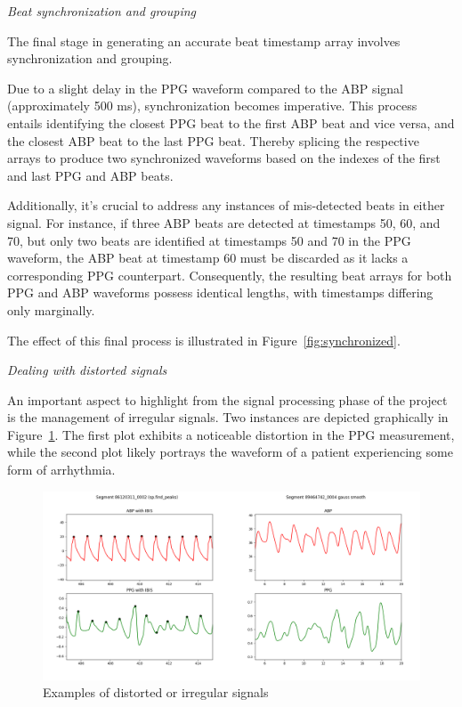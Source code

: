 \textit{Beat synchronization and grouping}
\vspace{0.1cm}

The final stage in generating an accurate beat timestamp array involves synchronization and grouping.

Due to a slight delay in the PPG waveform compared to the ABP signal (approximately 500 ms), synchronization becomes imperative.
This process entails identifying the closest PPG beat to the first ABP beat and vice versa, and the closest ABP beat to the last PPG beat.
Thereby splicing the respective arrays to produce two synchronized waveforms based on the indexes of the first and last PPG and ABP beats.

Additionally, it's crucial to address any instances of mis-detected beats in either signal.
For instance, if three ABP beats are detected at timestamps 50, 60, and 70, but only two beats are identified at timestamps 50 and 70 in the PPG waveform,
the ABP beat at timestamp 60 must be discarded as it lacks a corresponding PPG counterpart.
Consequently, the resulting beat arrays for both PPG and ABP waveforms possess identical lengths, with timestamps differing only marginally.

The effect of this final process is illustrated in Figure~\ref{fig:synchronized}.

\vspace{0.2cm}
\textit{Dealing with distorted signals}
\vspace{0.2cm}

An important aspect to highlight from the signal processing phase of the project is the management of irregular signals.
Two instances are depicted graphically in Figure~\ref{fig:distorted}.
The first plot exhibits a noticeable distortion in the PPG measurement, while the second plot likely portrays the waveform of a patient experiencing some form of arrhythmia.

\begin{figure}[h]
    \includegraphics[width=\textwidth]{images/methods/cringe_signals}
    \vspace{-1.2cm}
    \captionsetup{format=plain, justification=centering, font=small}
    \caption{Examples of distorted or irregular signals}
    \label{fig:distorted}
\end{figure}

